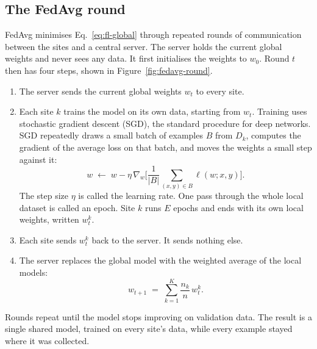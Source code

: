 \subsection{The FedAvg round}

FedAvg minimises Eq.~\ref{eq:fl-global} through repeated rounds of communication between the sites and a central server. The server holds the current global weights and never sees any data. It first initialises the weights to $w_0$. Round $t$ then has four steps, shown in Figure~\ref{fig:fedavg-round}.

\begin{enumerate}
\item The server sends the current global weights $w_t$ to every site.
\item Each site $k$ trains the model on its own data, starting from $w_t$. Training uses stochastic gradient descent (SGD), the standard procedure for deep networks. SGD repeatedly draws a small batch of examples $B$ from $D_k$, computes the gradient of the average loss on that batch, and moves the weights a small step against it:
\begin{equation}
\label{eq:fl-sgd}
w \;\leftarrow\; w - \eta \, \nabla_w \Bigg[ \frac{1}{|B|} \sum_{(x, y) \in B} \ell(w; x, y) \Bigg].
\end{equation}
The step size $\eta$ is called the learning rate. One pass through the whole local dataset is called an epoch. Site $k$ runs $E$ epochs and ends with its own local weights, written $w_t^{k}$.
\item Each site sends $w_t^{k}$ back to the server. It sends nothing else.
\item The server replaces the global model with the weighted average of the local models:
\begin{equation}
\label{eq:fl-agg}
w_{t+1} \;=\; \sum_{k=1}^{K} \frac{n_k}{n} \, w_t^{k}.
\end{equation}
\end{enumerate}

Rounds repeat until the model stops improving on validation data. The result is a single shared model, trained on every site's data, while every example stayed where it was collected.

